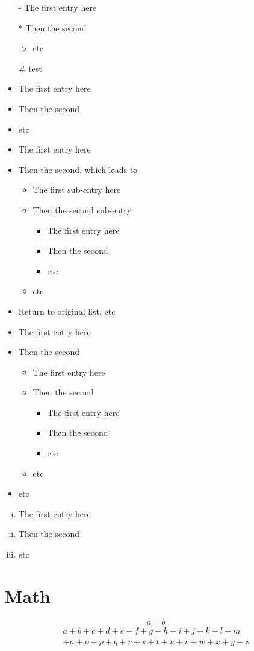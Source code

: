 \documentclass[11pt]{article}
\begin{document}
\begin{itemize}
\item[-] The first entry here
\item[*] Then the second
\item[$>$] etc
\item[\#] test
\end{itemize}

\renewcommand{\labelitemi}{$\bullet$}
\begin{itemize}
\item The first entry here
\item Then the second
\item etc
\end{itemize}

\begin{itemize}
\item The first entry here
\item Then the second, which leads to
\begin{itemize}
\item The first sub-entry here
\item Then the second sub-entry
\begin{itemize}
\item The first entry here
\item Then the second
\item etc
\end{itemize}
\item etc
\end{itemize}
\item Return to original list, etc
\end{itemize}

\renewcommand{\labelitemi}{\textgreater}
\renewcommand{\labelitemii}{$\star$}
\renewcommand{\labelitemiii}{$\bullet$}
\begin{itemize}
\item The first entry here
\item Then the second
\begin{itemize}
\item The first entry here
\item Then the second
\begin{itemize}
\item The first entry here
\item Then the second
\item etc
\end{itemize}
\item etc
\end{itemize}
\item etc
\end{itemize}

\begin{enumerate}[(i)]
\item The first entry here
\item Then the second
\item etc
\end{enumerate}

\section{Math}

\begin{equation*}
a+b
\end{equation*}
\begin{multline}
a+b+c+d+e+f+g+h+i+j+k+l+m\\
+n+o+p+q+r+s+t+u+v+w+x+y+z
\end{multline}
\end{document}
